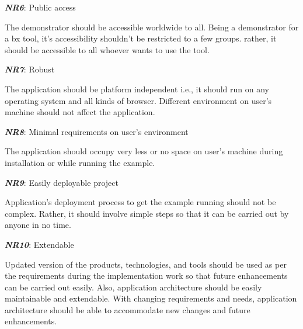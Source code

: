 \textbf{\textit{NR6}}: Public access

The demonstrator should be accessible worldwide to all. Being a demonstrator for a bx tool, it's accessibility shouldn't be restricted to a few groups. rather, it should be accessible to all whoever wants to use the tool.

\textbf{\textit{NR7}}: Robust

The application should be platform independent i.e., it should run on any operating system and all kinds of browser. Different environment on user's machine should not affect the application.

\textbf{\textit{NR8}}: Minimal requirements on user's environment

The application should occupy very less or no space on user's machine during installation or while running the example. 
 
\textbf{\textit{NR9}}: Easily deployable project

Application's deployment process to get the example running should not be complex. Rather, it should involve simple steps so that it can be carried out by anyone in no time.

\textbf{\textit{NR10}}: Extendable

Updated version of the products, technologies, and tools should be used as per the requirements during the implementation work so that future enhancements can be carried out easily. Also, application architecture should be easily maintainable and extendable. With changing requirements and needs, application architecture should be able to accommodate new changes and future enhancements.
